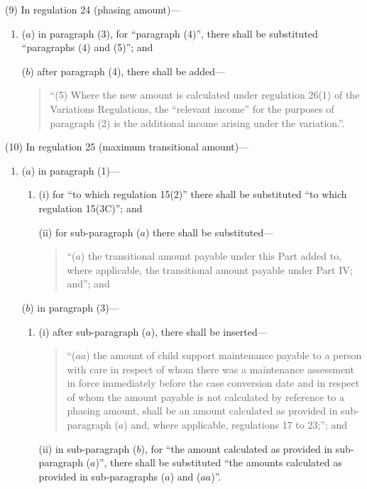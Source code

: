 \documentclass[12pt,a4paper]{article}
\begin{document}
(9) In regulation 24 (phasing amount)—
\begin{enumerate}\item[]
($a$) in paragraph (3), for “paragraph (4)”, there shall be substituted “paragraphs (4) and (5)”; and

($b$) after paragraph (4), there shall be added—
\begin{quotation}
“(5) Where the new amount is calculated under regulation 26(1) of the Variations Regulations, the “relevant income” for the purposes of paragraph (2) is the additional income arising under the variation.”.
\end{quotation}
\end{enumerate}

(10) In regulation 25 (maximum transitional amount)—
\begin{enumerate}\item[]
($a$) in paragraph (1)—
\begin{enumerate}\item[]
(i) for “to which regulation 15(2)” there shall be substituted “to which regulation 15(3C)”; and

(ii) for sub-paragraph ($a$)  there shall be substituted—
\begin{quotation}
“($a$) the transitional amount payable under this Part added to, where applicable, the transitional amount payable under Part IV; and”; and
\end{quotation}
\end{enumerate}

($b$) in paragraph (3)—
\begin{enumerate}\item[]
(i) after sub-paragraph ($a$), there shall be inserted—
\begin{quotation}
“($aa$) the amount of child support maintenance payable to a person with care in respect of whom there was a maintenance assessment in force immediately before the case conversion date and in respect of whom the amount payable is not calculated by reference to a phasing amount, shall be an amount calculated as provided in sub-paragraph ($a$)  and, where applicable, regulations 17 to 23;”; and
\end{quotation}

(ii) in sub-paragraph ($b$), for “the amount calculated as provided in sub-paragraph ($a$)”, there shall be substituted “the amounts calculated as provided in sub-paragraphs ($a$)  and ($aa$)”.
\end{enumerate}
\end{enumerate}
\end{document}
